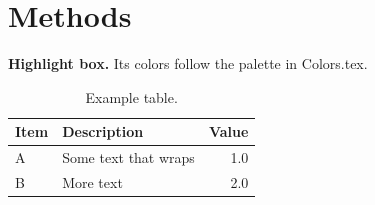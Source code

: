 \section{Methods}
\label{sec:paper2:methods}
\lipsum[3]

\begin{boxJ}
\textbf{Highlight box.} Its colors follow the palette in Colors.tex.
\end{boxJ}

\begin{table}[h]
    \centering
    \caption{Example table.}
    \label{tab:paper2:example}
    \begin{tabularx}{\linewidth}{lLR}
        \toprule
        Item & Description & Value \\
        \midrule
        A & Some text that wraps & 1.0 \\
        B & More text & 2.0 \\
        \bottomrule
    \end{tabularx}
\end{table}
